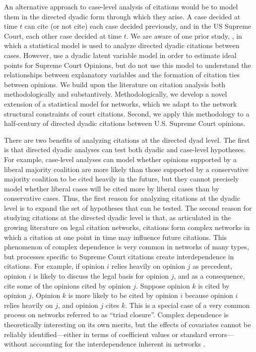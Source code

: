 \documentclass[headsepline=true, abstracton]{scrartcl}
\begin{document}
An alternative approach to case-level analysis of citations would be to model them in the directed dyadic form through which they arise. A case decided at time $t$ can cite (or not cite) each case decided previously, and in the US Supreme Court, each other case decided at time $t$. We are aware of one prior study, \citet{clark2010locating}, in which a statistical model is used to analyze directed dyadic citations between cases. However, \citet{clark2010locating} use a dyadic latent variable model in order to estimate ideal points for Supreme Court Opinions, but do not use this model to understand the relationships between explanatory variables and the formation of citation ties between opinions. We build upon the literature on citation analysis both methodologically and substantively. Methodologically, we develop a novel extension of a statistical model for networks, which we adapt to the network structural constraints of court citations. Second, we apply this methodology to a half-century of directed dyadic citations between U.S. Supreme Court opinions.

There are two benefits of analyzing citations at the directed dyad level. The first is that directed dyadic analyses can test both dyadic and case-level hypotheses. For example, case-level analyses can model whether opinions supported by a liberal majority coalition are more likely than those supported by a conservative majority coalition to be cited heavily in the future, but they cannot precisely model whether liberal cases will be cited more by liberal cases than by conservative cases. Thus, the first reason for analyzing citations at the dyadic level is to expand the set of hypotheses that can be tested. The second reason for studying citations at the directed dyadic level is that, as articulated in the growing literature on legal citation networks, citations form complex networks in which a citation at one point in time may influence future citations. This phenomenon of complex dependence is very common in networks of many types, but processes specific to Supreme Court citations create interdependence in citations. For example, if opinion $i$ relies heavily on opinion $j$ as precedent, opinion $i$ is likely to discuss the legal basis for opinion $j$, and as a consequence, cite some of the opinions cited by opinion $j$. Suppose opinion $k$ is cited by opinion $j$. Opinion $k$ is more likely to be cited by opinion $i$ because opinion $i$ relies heavily on $j$, and opinion $j$ cites $k$.  This is a special case of a very common process on networks referred to as ``triad closure''. Complex dependence is theoretically interesting on its own merits, but the effects of covariates cannot be reliably identified---either in terms of coefficient values or standard errors---without accounting for the interdependence inherent in networks \citep{cranmer2016critique}. 
\end{document}
